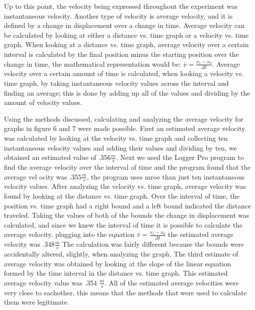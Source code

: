 \documentclass[aps,letterpaper,11pt]{revtex4}
\begin{document}
Up to this point, the velocity being expressed throughout the experiment was instantaneous velocity. Another type of velocity is average velocity, and it is defined by a change in displacement over a change in time. Average velocity can be calculated by looking at either a distance vs. time graph or a velocity vs. time graph. When looking at a distance vs. time graph, average velocity over a certain interval is calculated by the final position minus the starting position over the change in time, the mathematical representation would be: $\bar{v} = \frac{x_1 - x_0}{\Delta t}$. Average velocity over a certain amount of time is calculated, when looking a velocity vs. time graph, by taking instantaneous velocity values across the interval and finding an average; this is done by adding up all of the values and dividing by the amount of velocity values. 

Using the methods discussed, calculating and analyzing the average velocity for graphs in figure 6 and 7 were made possible. First an estimated average velocity was calculated by looking at the velocity vs. time graph and collecting ten instantaneous velocity values and adding their values and dividing by ten, we obtained an estimated value of .356$\frac{m}{s}$. Next we used the Logger Pro program to find the average velocity over the interval of time and the program found that the average vel ocity was .355$\frac{m}{s}$, the program uses mroe than just ten instantaneous velocity values. After analyzing the velocity vs. time graph, average velocity was found by looking at the distance vs. time graph. Over the interval of time, the position vs. time graph had a right bound and a left bound indicated the distance traveled. Taking the values of both of the bounds the change in displacement was calculated, and since we knew the interval of time it is possible to calculate the average velocity. plugging into the equation $\bar{v} = \frac{x_1 - x_0}{\Delta t}$ the estimated average velocity was .348$\frac{m}{s}$ The calculation was fairly different because the bounds were accidentally altered, slightly, when analyzing the graph. The third estimate of average velocity was obtained by looking at the slope of the linear equation formed by the time interval in the distance vs. time graph. This estimated average velocity value was .354 $\frac{m}{s}$. All of the estimated average velocities were very close to eachother, this means that the methods that were used to calculate them were legitimate.
\end{document}

